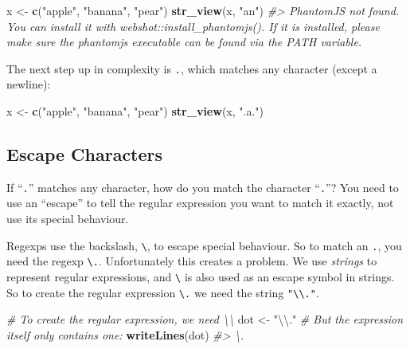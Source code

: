 \documentclass[]{book}
\newenvironment{Shaded}{\begin{snugshade}}{\end{snugshade}}
\newcommand{\KeywordTok}[1]{\textcolor[rgb]{0.13,0.29,0.53}{\textbf{#1}}}
\newcommand{\CharTok}[1]{\textcolor[rgb]{0.31,0.60,0.02}{#1}}
\newcommand{\StringTok}[1]{\textcolor[rgb]{0.31,0.60,0.02}{#1}}
\newcommand{\CommentTok}[1]{\textcolor[rgb]{0.56,0.35,0.01}{\textit{#1}}}
\newcommand{\NormalTok}[1]{#1}
\begin{document}
\begin{Shaded}
\begin{Highlighting}[]
\NormalTok{x <-}\StringTok{ }\KeywordTok{c}\NormalTok{(}\StringTok{"apple"}\NormalTok{, }\StringTok{"banana"}\NormalTok{, }\StringTok{"pear"}\NormalTok{)}
\KeywordTok{str_view}\NormalTok{(x, }\StringTok{"an"}\NormalTok{)}
\CommentTok{#> PhantomJS not found. You can install it with webshot::install_phantomjs(). If it is installed, please make sure the phantomjs executable can be found via the PATH variable.}
\end{Highlighting}
\end{Shaded}

\hypertarget{htmlwidget-f9d1e794c5feb6374ab8}{}

The next step up in complexity is \texttt{.}, which matches any
character (except a newline):

\begin{Shaded}
\begin{Highlighting}[]
\NormalTok{x <-}\StringTok{ }\KeywordTok{c}\NormalTok{(}\StringTok{"apple"}\NormalTok{, }\StringTok{"banana"}\NormalTok{, }\StringTok{"pear"}\NormalTok{)}
\KeywordTok{str_view}\NormalTok{(x, }\StringTok{".a."}\NormalTok{)}
\end{Highlighting}
\end{Shaded}

\hypertarget{htmlwidget-dd3d01f170c0aa6859bc}{}

\subsection{Escape Characters}\label{escape-characters}

If ``\texttt{.}'' matches any character, how do you match the character
``\texttt{.}''? You need to use an ``escape'' to tell the regular
expression you want to match it exactly, not use its special behaviour.

Regexps use the backslash, \texttt{\textbackslash{}}, to escape special
behaviour. So to match an \texttt{.}, you need the regexp
\texttt{\textbackslash{}.}. Unfortunately this creates a problem. We use
\emph{strings} to represent regular expressions, and
\texttt{\textbackslash{}} is also used as an escape symbol in strings.
So to create the regular expression \texttt{\textbackslash{}.} we need
the string \texttt{"\textbackslash{}\textbackslash{}."}.

\begin{Shaded}
\begin{Highlighting}[]
\CommentTok{# To create the regular expression, we need \textbackslash{}\textbackslash{}}
\NormalTok{dot <-}\StringTok{ "}\CharTok{\textbackslash{}\textbackslash{}}\StringTok{."}
\CommentTok{# But the expression itself only contains one:}
\KeywordTok{writeLines}\NormalTok{(dot)}
\CommentTok{#> \textbackslash{}.}
\end{Highlighting}
\end{Shaded}
\end{document}
